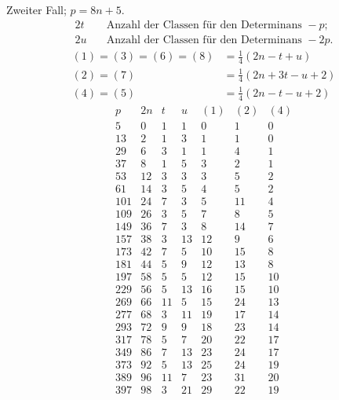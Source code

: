 Zweiter Fall; $p=8n+5$.
\[
\begin{aligned}
2t&\quad\text{Anzahl der Classen für den Determinans }-p;\\
2u&\quad\text{Anzahl der Classen für den Determinans }-2p.
\end{aligned}
\]
\[
\begin{aligned}
(1)=(3)=(6)=(8)&=\tfrac14(2n-t+u)\\
(2)=(7)&=\tfrac14(2n+3t-u+2)\\
(4)=(5)&=\tfrac14(2n-t-u+2)
\end{aligned}
\]
\[
\begin{array}{r|r|r|r|r|r|r}
p&2n&t&u&(1)&(2)&(4)\\\hline
5&0&1&1&0&1&0\\
13&2&1&3&1&1&0\\
29&6&3&1&1&4&1\\
37&8&1&5&3&2&1\\
53&12&3&3&3&5&2\\
61&14&3&5&4&5&2\\
101&24&7&3&5&11&4\\
109&26&3&5&7&8&5\\
149&36&7&3&8&14&7\\
157&38&3&13&12&9&6\\
173&42&7&5&10&15&8\\
181&44&5&9&12&13&8\\
197&58&5&5&12&15&10\\
229&56&5&13&16&15&10\\
269&66&11&5&15&24&13\\
277&68&3&11&19&17&14\\
293&72&9&9&18&23&14\\
317&78&5&7&20&22&17\\
349&86&7&13&23&24&17\\
373&92&5&13&25&24&19\\
389&96&11&7&23&31&20\\
397&98&3&21&29&22&19
\end{array}
\]

